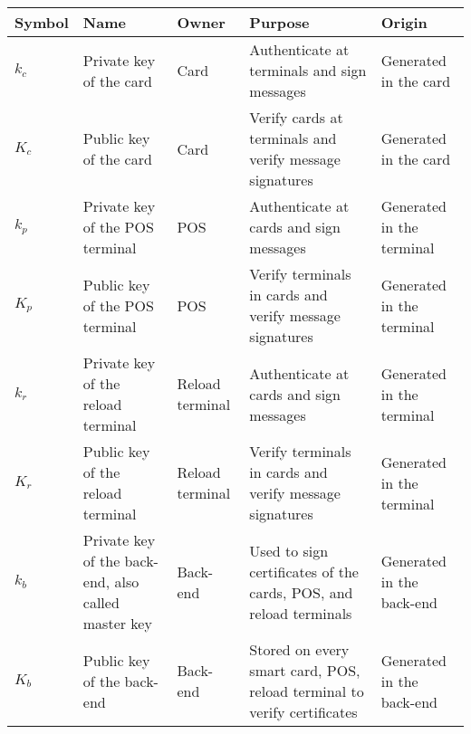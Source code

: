 \begin{tabular}{|l|p{3cm}|p{1.5cm}|p{4.7cm}|p{2.7cm}|}
\hline
    Symbol & Name & Owner & Purpose & Origin \\
\hline
    $k_c$ & Private key of the card & Card & Authenticate at terminals and sign messages & Generated in the card \\
\hline
    $K_c$ & Public key of the card & Card & Verify cards at terminals and verify message signatures & Generated in the card \\
\hline
    $k_p$ & Private key of the POS terminal & POS & Authenticate at cards and sign messages& Generated in the terminal \\
\hline
    $K_p$ & Public key of the POS terminal & POS & Verify terminals in cards and verify message signatures & Generated in the terminal \\
\hline  
    $k_r$ & Private key of the reload terminal & Reload terminal & Authenticate at cards and sign messages & Generated in the terminal \\
\hline
    $K_r$ & Public key of the reload terminal & Reload terminal & Verify terminals in cards and verify message signatures & Generated in the terminal \\
\hline
    $k_b$ & Private key of the back-end, also called master key & Back-end & Used to sign certificates of the cards, POS, and reload terminals & Generated in the back-end \\
\hline
    $K_b$ & Public key of the back-end & Back-end & Stored on every smart card, POS, reload terminal to verify certificates & Generated in the back-end \\
\hline
\end{tabular}